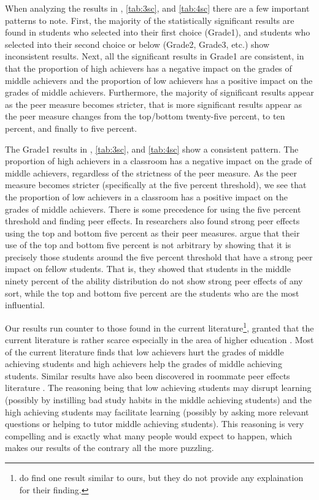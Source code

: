 \clearpage{}

When analyzing the results in , \ref{tab:3sc}, and \ref{tab:4sc} there are a few important patterns to note. 
First, the majority of the statistically significant results are found in students who selected into their first choice (Grade1), and students who selected into their second choice or below (Grade2, Grade3, etc.) show inconsistent results. 
Next, all the significant results in Grade1 are consistent, in that the proportion of high achievers has a negative impact on the grades of middle achievers and the proportion of low achievers has a positive impact on the grades of middle achievers. 
Furthermore, the majority of significant results appear as the peer measure becomes stricter, that is more significant results appear as the peer measure changes from the top/bottom twenty-five percent, to ten percent, and finally to five percent. 
 
The Grade1 results in , \ref{tab:3sc}, and \ref{tab:4sc} show a consistent pattern. 
The proportion of high achievers in a classroom has a negative impact on the grade of middle achievers, regardless of the strictness of the peer measure. 
As the peer measure becomes stricter (specifically at the five percent threshold), we see that the proportion of low achievers in a classroom has a positive impact on the grades of middle achievers. 
There is some precedence for using the five percent threshold and finding peer effects. 
In \citet{lavy2012good} researchers also found strong peer effects using the top and bottom five percent as their peer measures. 
\citet{lavy2012good} argue that their use of the top and bottom five percent is not arbitrary by showing that it is precisely those students around the five percent threshold that have a strong peer impact on fellow students. 
That is, they showed that students in the middle ninety percent of the ability distribution do not show strong peer effects of any sort, while the top and bottom five percent are the students who are the most influential. 

Our results run counter to those found in the current literature\footnote{\citet{burke2013classroom} do find one result similar to ours, but they do not provide any explaination for their finding.}, granted that the current literature is rather scarce especially in the area of higher education \citep{kang2007classroom,carman2012classroom,burke2013classroom,schlosser2008inside,lavy2012good}. 
Most of the current literature finds that low achievers hurt the grades of middle achieving students and high achievers help the grades of middle achieving students. 
Similar results have also been discovered in roommate peer effects literature \citep{griffith2014peer,zimmerman2003peer,sacerdote2000peer}.
The reasoning being that low achieving students may disrupt learning (possibly by instilling bad study habits in the middle achieving students) and the high achieving students may facilitate learning (possibly by asking more relevant questions or helping to tutor middle achieving students). 
This reasoning is very compelling and is exactly what many people would expect to happen, which makes our results of the contrary all the more puzzling.  


